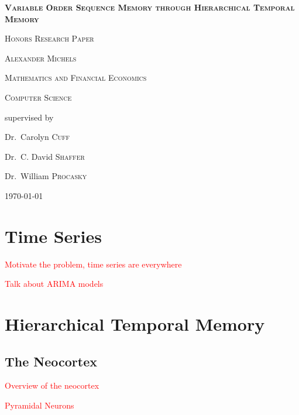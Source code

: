\documentclass[fleqn,minimal]{article}
\newcommand\blankpage{
	\pagebreak
	\ifthispageodd{\null
		\vfill
		\vfill
		\thispagestyle{empty}
		\clearpage}{}
}
\begin{document}
	\begin{titlepage}
		\centering
		{\scshape\LARGE \textbf{Variable Order Sequence Memory through Hierarchical Temporal Memory} \par}
		{\scshape\LARGE Honors Research Paper \par}
		\vspace{1cm}
		{\scshape\Large Alexander Michels\par}
		\vspace{0.5cm}
		{\scshape\Large Mathematics and Financial Economics\par}
		\vspace{0.5cm}
		{\scshape\Large Computer Science\par}
		\vspace{1cm}
		\vfill \large
		supervised by\par
		Dr.~Carolyn \textsc{Cuff}\par
		Dr.~C. David \textsc{Shaffer}\par
		Dr.~William \textsc{Procasky}\par
		
		\vfill
		
		{\large \today\par}
	\end{titlepage}
	
	\blankpage
	\tableofcontents
	
	\blankpage
	\listoffigures
	
	\blankpage
	
	\section{Time Series}
	
	\textcolor{red}{Motivate the problem, time series are everywhere}
	
	\textcolor{red}{Talk about ARIMA models}
	
	\section{Hierarchical Temporal Memory}
	
	\subsection{The Neocortex}
	
	\textcolor{red}{Overview of the neocortex}
	
	\textcolor{red}{Pyramidal Neurons}
	
\end{document}
